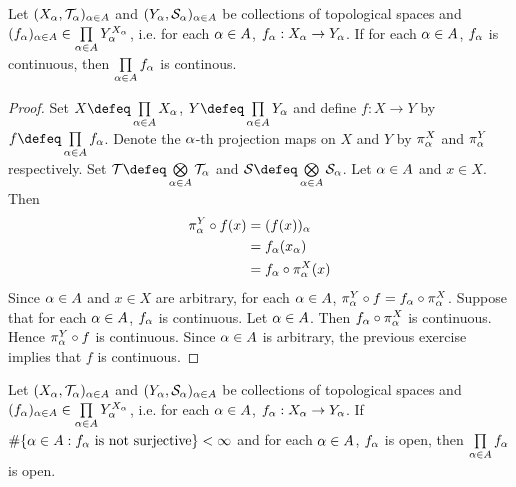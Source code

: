 \documentclass{book}
\begin{document}
	\begin{ex}
		Let $(X_{\alpha}, \mathcal{T}_{\alpha})_{\alpha \in A}$ and $(Y_{\alpha}, \mathcal{S}_{\alpha})_{\alpha \in A}$ be collections of topological spaces and $(f_{\alpha})_{\alpha \in A} \in \prod\limits_{\alpha \in A} Y_{\alpha}^{X_{\alpha}}$, i.e. for each $\alpha \in A$, $f_{\alpha}:X_{\alpha} \rightarrow Y_{\alpha}$. If for each $\alpha \in A$, $f_{\alpha}$ is continuous, then $\prod\limits_{\alpha \in A} f_{\alpha}$ is continous.
	\end{ex}

	\begin{proof}
		Set $X \defeq \prod\limits_{\al \in A} X_{\al}$, $Y \defeq \prod\limits_{\al \in A}Y_{\al}$ and define $f: X \rightarrow Y$ by $f \defeq \prod\limits_{\al \in A} f_{\al}$. Denote the $\alpha$-th projection maps on $X$ and $Y$ by $\pi^X_{\alpha}$ and $\pi^Y_{\alpha}$ respectively. Set $\MT \defeq \bigotimes\limits_{\al \in A}\MT_{\al}$ and $\MS \defeq \bigotimes\limits_{\al \in A} \MS_{\al}$. Let $\alpha \in A$ and $x \in X$. Then
		\begin{align*}
			\pi^Y_{\alpha} \circ f(x) 
			& = (f(x))_{\alpha} \\
			& = f_{\alpha}(x_{\alpha}) \\
			& = f_{\alpha} \circ \pi^X_{\alpha}(x) 
		\end{align*}
		Since $\alpha \in A$ and $x \in X$ are arbitrary, for each $\alpha \in A$, $\pi^Y_{\alpha} \circ f = f_{\alpha} \circ \pi^X_{\alpha}$. Suppose that for each $\alpha \in A$, $f_{\alpha}$ is continuous. Let $\alpha \in A$. Then $f_{\alpha} \circ \pi^X_{\alpha}$ is continuous. Hence $\pi^Y_{\alpha} \circ f$ is continuous. Since $\alpha \in A$ is arbitrary, the previous exercise implies that $f$ is continuous.
	\end{proof}

	\begin{ex}
		Let $(X_{\alpha}, \mathcal{T}_{\alpha})_{\alpha \in A}$ and $(Y_{\alpha}, \mathcal{S}_{\alpha})_{\alpha \in A}$ be collections of topological spaces and $(f_{\alpha})_{\alpha \in A} \in \prod\limits_{\alpha \in A} Y_{\alpha}^{X_{\alpha}}$, i.e. for each $\alpha \in A$, $f_{\alpha}:X_{\alpha} \rightarrow Y_{\alpha}$. If $\# \{\alpha \in A: f_{\alpha} \text{ is not surjective}\} < \infty$ and for each $\alpha \in A$, $f_{\alpha}$ is open, then $\prod\limits_{\alpha \in A} f_{\alpha}$ is open.
	\end{ex}
\end{document}
